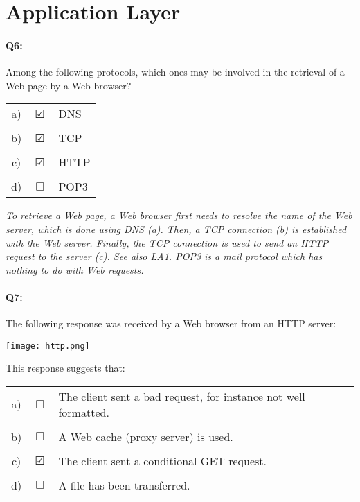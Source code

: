 \documentclass{llncs}
\newcommand{\answer}[1]{{\color{red}\textit{#1}\color{black}}}
\begin{document}
\section{Application Layer}

\paragraph{\textbf{Q6:}}
Among the following protocols, which ones may be involved in the
retrieval of a Web page by a Web browser?

\begin{tabular}{ccl}
  a) & $\CheckedBox$ & DNS\\
  \\
  b) & $\CheckedBox$ & TCP\\
  \\
  c) & $\CheckedBox$ & HTTP\\
  \\
  d) & $\Box$ & POP3
\end{tabular}

\answer{To retrieve a Web page, a Web browser first needs to resolve
  the name of the Web server, which is done using DNS (a). Then, a TCP
  connection (b) is established with the Web server. Finally, the TCP
  connection is used to send an HTTP request to the server (c). See
  also LA1. POP3 is a mail protocol which has nothing to do with Web
  requests.}

\paragraph{\textbf{Q7:}}
The following response was received by a Web browser from an HTTP server:

\texttt{[image: http.png]}

This response suggests that:

\begin{tabular}{ccl}
  a) & $\Box$ & The client sent a bad request, for instance not well formatted.\\
  \\
  b) & $\Box$ & A Web cache (proxy server) is used. \\
  \\
  c) & $\CheckedBox$ & The client sent a conditional GET request.\\
  \\
  d) & $\Box$ & A file has been transferred.
\end{tabular}
\end{document}
